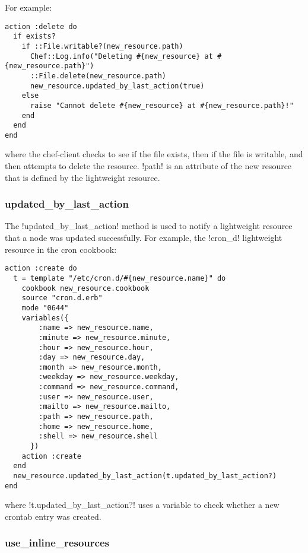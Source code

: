 For example:

\begin{lstlisting}[label=lst:cookbook-lwrp-dsl-new-resource]
action :delete do
  if exists?
    if ::File.writable?(new_resource.path)
      Chef::Log.info("Deleting #{new_resource} at #{new_resource.path}")
      ::File.delete(new_resource.path)
      new_resource.updated_by_last_action(true)
    else
      raise "Cannot delete #{new_resource} at #{new_resource.path}!"
    end
  end
end
\end{lstlisting}

where the chef-client checks to see if the file exists, then if the file is writable, and then attempts to delete the resource. \inline!path! is an attribute of the new resource that is defined by the lightweight resource.

\subsubsection{updated\_by\_last\_action}

The \inline!updated_by_last_action! method is used to notify a lightweight resource that a node was updated successfully. For example, the \inline!cron_d! lightweight resource in the cron cookbook:

\begin{lstlisting}[label=lst:cookbook-lwrp-dsl-updated]
action :create do
  t = template "/etc/cron.d/#{new_resource.name}" do
    cookbook new_resource.cookbook
    source "cron.d.erb"
    mode "0644"
    variables({
        :name => new_resource.name,
        :minute => new_resource.minute,
        :hour => new_resource.hour,
        :day => new_resource.day,
        :month => new_resource.month,
        :weekday => new_resource.weekday,
        :command => new_resource.command,
        :user => new_resource.user,
        :mailto => new_resource.mailto,
        :path => new_resource.path,
        :home => new_resource.home,
        :shell => new_resource.shell
      })
    action :create
  end
  new_resource.updated_by_last_action(t.updated_by_last_action?)
end
\end{lstlisting}

where \inline!t.updated_by_last_action?! uses a variable to check whether a new crontab entry was created.

\subsubsection{use\_inline\_resources}

